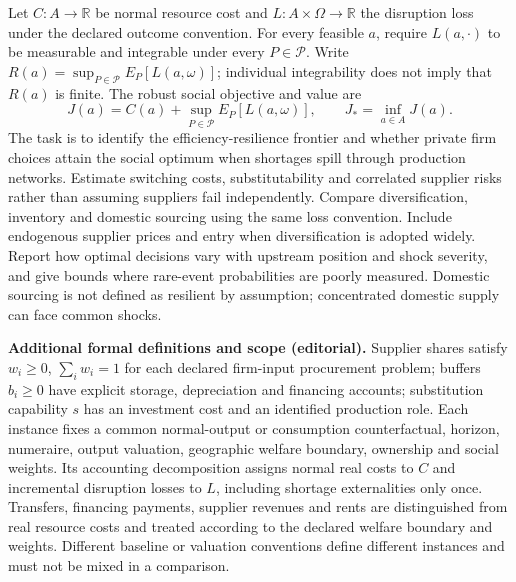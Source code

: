 \documentclass[11pt,a4paper]{article}
\begin{document}
Let \(C:A\to\mathbb R\) be normal resource cost and \(L:A\times\Omega\to\mathbb R\) the disruption loss under the declared outcome convention. For every feasible \(a\), require \(L(a,\cdot)\) to be measurable and integrable under every \(P\in\mathcal P\). Write \(R(a)=\sup_{P\in\mathcal P}E_P[L(a,\omega)]\); individual integrability does not imply that \(R(a)\) is finite. The robust social objective and value are
\[J(a)=C(a)+\sup_{P\in\mathcal P}E_P[L(a,\omega)],\qquad J_*=\inf_{a\in A}J(a).\]
The task is to identify the efficiency-resilience frontier and whether private firm choices attain the social optimum when shortages spill through production networks. Estimate switching costs, substitutability and correlated supplier risks rather than assuming suppliers fail independently. Compare diversification, inventory and domestic sourcing using the same loss convention. Include endogenous supplier prices and entry when diversification is adopted widely. Report how optimal decisions vary with upstream position and shock severity, and give bounds where rare-event probabilities are poorly measured. Domestic sourcing is not defined as resilient by assumption; concentrated domestic supply can face common shocks.

\textbf{Additional formal definitions and scope (editorial).} Supplier shares satisfy \(w_i\geq0\), \(\sum_iw_i=1\) for each declared firm-input procurement problem; buffers \(b_i\geq0\) have explicit storage, depreciation and financing accounts; substitution capability \(s\) has an investment cost and an identified production role. Each instance fixes a common normal-output or consumption counterfactual, horizon, numeraire, output valuation, geographic welfare boundary, ownership and social weights. Its accounting decomposition assigns normal real costs to \(C\) and incremental disruption losses to \(L\), including shortage externalities only once. Transfers, financing payments, supplier revenues and rents are distinguished from real resource costs and treated according to the declared welfare boundary and weights. Different baseline or valuation conventions define different instances and must not be mixed in a comparison.
\end{document}
